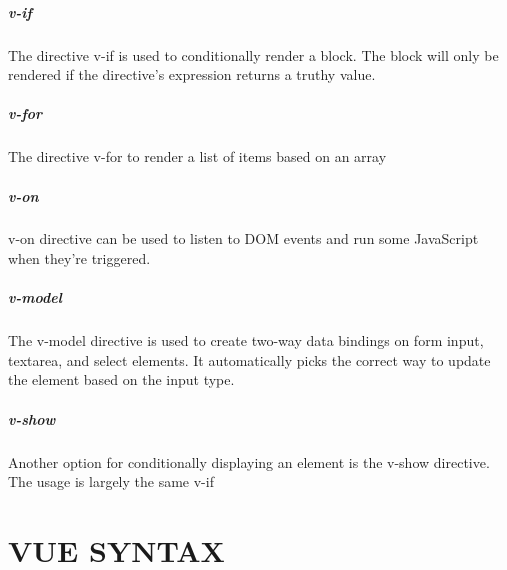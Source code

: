 \documentclass[12pt,a4paper,oneside]{report}
\begin{document}
\paragraph{v-if}
The directive v-if is used to conditionally render a block.
The block will only be rendered if the directive’s expression returns a truthy value.
\paragraph{v-for}

The directive v-for to render a list of items based on an array
\paragraph{v-on}

 v-on directive can be used  to listen to DOM events and run some JavaScript when they’re triggered.

\paragraph{v-model}

The v-model directive is used to create two-way data bindings on form input, textarea, and select
elements.
It automatically picks the correct way to update the element based on the input type.
\paragraph{v-show}
Another option for conditionally displaying an element is the v-show directive. The usage is largely the same v-if
\chapter{VUE SYNTAX }
\end{document}
